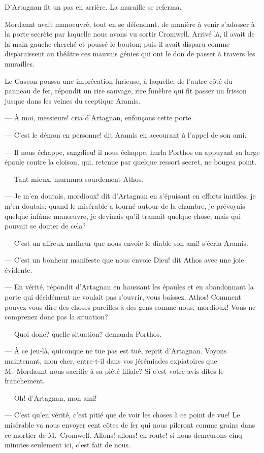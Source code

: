 D'Artagnan fit un pas en arrière. La muraille se referma.

Mordaunt avait manoeuvré, tout en se défendant, de manière à venir s'adosser à la porte secrète par laquelle nous avons vu sortir Cromwell. Arrivé là, il avait de la main gauche cherché et poussé le bouton; puis il avait disparu comme disparaissent au théâtre ces mauvais génies qui ont le don de passer à travers les murailles.

Le Gascon poussa une imprécation furieuse, à laquelle, de l'autre côté du panneau de fer, répondit un rire sauvage, rire funèbre qui fit passer un frisson jusque dans les veines du sceptique Aramis.

— À moi, messieurs! cria d'Artagnan, enfonçons cette porte.

— C'est le démon en personne! dit Aramis en accourant à l'appel de son ami.

— Il nous échappe, sangdieu! il nous échappe, hurla Porthos en appuyant sa large épaule contre la cloison, qui, retenue par quelque ressort secret, ne bougea point.

— Tant mieux, murmura sourdement Athos.

— Je m'en doutais, mordioux! dit d'Artagnan en s'épuisant en efforts inutiles, je m'en doutais; quand le misérable a tourné autour de la chambre, je prévoyais quelque infâme manœuvre, je devinais qu'il tramait quelque chose; mais qui pouvait se douter de cela?

— C'est un affreux malheur que nous envoie le diable son ami! s'écria Aramis.

— C'est un bonheur manifeste que nous envoie Dieu! dit Athos avec une joie évidente.

— En vérité, répondit d'Artagnan en haussant les épaules et en abandonnant la porte qui décidément ne voulait pas s'ouvrir, vous baissez, Athos! Comment pouvez-vous dire des choses pareilles à des gens comme nous, mordioux! Vous ne comprenez donc pas la situation?

— Quoi donc? quelle situation? demanda Porthos.

— À ce jeu-là, quiconque ne tue pas est tué, reprit d'Artagnan. Voyons maintenant, mon cher, entre-t-il dans vos jérémiades expiatoires que M.~Mordaunt nous sacrifie à sa piété filiale? Si c'est votre avis dites-le franchement.

— Oh! d'Artagnan, mon ami!

— C'est qu'en vérité, c'est pitié que de voir les choses à ce point de vue! Le misérable va nous envoyer cent côtes de fer qui nous pileront comme grains dans ce mortier de M.~Cromwell. Allons! allons! en route! si nous demeurons cinq minutes seulement ici, c'est fait de nous.

